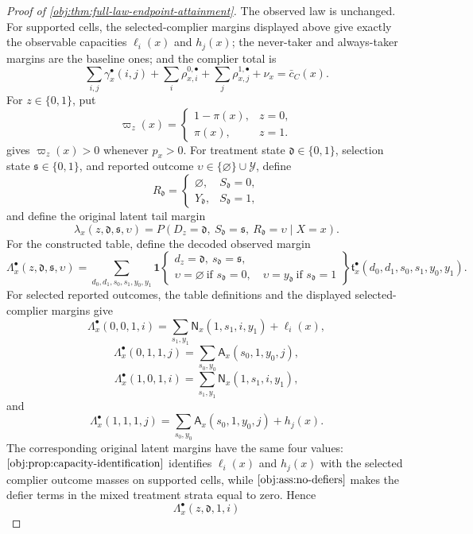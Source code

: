 \begin{proof}[Proof of \cref{obj:thm:full-law-endpoint-attainment}]
The observed law is unchanged.  For supported cells, the selected-complier margins displayed above give exactly the observable capacities \(\ell_i(x)\) and \(h_j(x)\); the never-taker and always-taker margins are the baseline ones; and the complier total is
\[
\sum_{i,j}\gamma^\bullet_x(i,j)
+\sum_i\rho^{0,\bullet}_{x,i}
+\sum_j\rho^{1,\bullet}_{x,j}
+\nu_x
=
\bar c_C(x).
\]
For \(z\in\{0,1\}\), put
\[
\varpi_z(x)=
\begin{cases}
1-\pi(x),& z=0,\\
\pi(x),& z=1.
\end{cases}
\]
 gives \(\varpi_z(x)>0\) whenever \(p_x>0\).  For treatment state \(\mathfrak d\in\{0,1\}\), selection state \(\mathfrak s\in\{0,1\}\), and reported outcome \(\upsilon\in\{\varnothing\}\cup\mathcal Y\), define
\[
R_{\mathfrak d}
=
\begin{cases}
\varnothing,& S_{\mathfrak d}=0,\\
Y_{\mathfrak d},& S_{\mathfrak d}=1,
\end{cases}
\]
and define the original latent tail margin
\[
\lambda_x(z,\mathfrak d,\mathfrak s,\upsilon)
=
P\!\left(D_z=\mathfrak d,\ S_{\mathfrak d}=\mathfrak s,\ R_{\mathfrak d}=\upsilon\mid X=x\right).
\]
For the constructed table, define the decoded observed margin
\[
\Lambda^\bullet_x(z,\mathfrak d,\mathfrak s,\upsilon)
=
\sum_{d_0,d_1,s_0,s_1,y_0,y_1}
\mathbf 1\!
\left\{
\begin{array}{c}
 d_z=\mathfrak d,\ s_{\mathfrak d}=\mathfrak s,\\
 \upsilon=\varnothing\ \text{if }s_{\mathfrak d}=0,\quad
 \upsilon=y_{\mathfrak d}\ \text{if }s_{\mathfrak d}=1
\end{array}
\right\}
\mathfrak t^\bullet_x(d_0,d_1,s_0,s_1,y_0,y_1).
\]
For selected reported outcomes, the table definitions and the displayed selected-complier margins give
\[
\Lambda^\bullet_x(0,0,1,i)
=
\sum_{s_1,y_1}\mathsf N_x(1,s_1,i,y_1)+\ell_i(x),
\]
\[
\Lambda^\bullet_x(0,1,1,j)
=
\sum_{s_0,y_0}\mathsf A_x(s_0,1,y_0,j),
\]
\[
\Lambda^\bullet_x(1,0,1,i)
=
\sum_{s_1,y_1}\mathsf N_x(1,s_1,i,y_1),
\]
and
\[
\Lambda^\bullet_x(1,1,1,j)
=
\sum_{s_0,y_0}\mathsf A_x(s_0,1,y_0,j)+h_j(x).
\]
The corresponding original latent margins have the same four values: \(\cref{obj:prop:capacity-identification}\) identifies \(\ell_i(x)\) and \(h_j(x)\) with the selected complier outcome masses on supported cells, while \(\cref{obj:ass:no-defiers}\) makes the defier terms in the mixed treatment strata equal to zero.  Hence
\[
\Lambda^\bullet_x(z,\mathfrak d,1,i)
\]
\end{proof}
